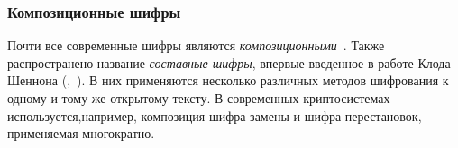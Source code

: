 \subsubsection{Композиционные шифры}

Почти все современные шифры являются \emph{композиционными}~\cite{AlZKCh:2001}. Также распространено название \emph{составные шифры}, впервые введенное в работе Клода Шеннона (,~\cite{Shannon:1949:CTS}). В них применяются несколько различных методов шифрования к одному и тому же открытому тексту. В современных криптосистемах используется,например, композиция шифра замены и шифра перестановок, применяемая многократно.
